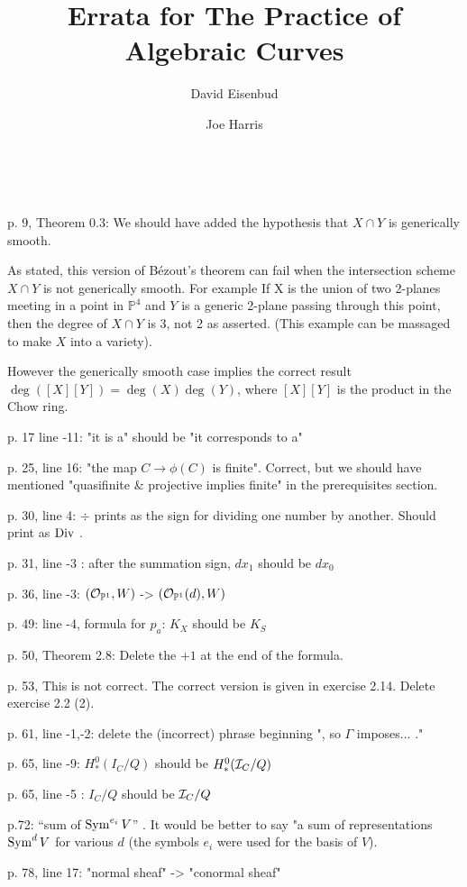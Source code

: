 \documentclass[twoside,12pt, leqno]{amsart}
\author[David Eisenbud]{David Eisenbud}
\author[Joe Harris ]{Joe Harris}
\title{Errata for The Practice of Algebraic Curves}
\def\PP{{\mathbb P}}
\begin{document}
\
\maketitle


\renewcommand{\thefootnote}{}%
%
p. 9, Theorem 0.3: We should have added the hypothesis that $X\cap Y$
is generically smooth. 

As stated, this version of B\'ezout's theorem can fail when the intersection
scheme $X\cap Y$ is not generically smooth. For example If X is the union of two 2-planes meeting in 
a point in $\PP^{4}$ and $Y$ is a generic 2-plane passing through this point, then
the degree of $X\cap Y$ is 3, not 2 as asserted. (This example can be massaged to
make $X$ into a variety).

However the generically smooth case implies the correct result
$\deg( [X][Y]) = \deg (X) \deg(Y)$, where $[X][Y]$ is the product in the Chow ring.

p. 17 line -11: "it is a" should be "it corresponds to a"

p. 25, line 16: "the map $C \to \phi(C)$ is finite". Correct, but we should have mentioned "quasifinite \& projective implies finite" in the prerequisites section.

p. 30, line 4:  $\div$ prints as the sign for dividing one number by another. Should print as $\rm Div$ . 

p. 31, line -3 : after the summation sign, $dx_1$ should be $dx_0$

p. 36, line -3: $(\sO_{\PP^1}, W)$  -> $(\sO_{\PP^1}(d), W)$

p. 49: line -4, formula for $p_a$: $K_X$ should be $K_S$

p. 50, Theorem 2.8: Delete the $+1$ at the end of the formula.

p. 53, This is not correct. The correct version is given in exercise 2.14. Delete exercise 2.2 (2). 

p. 61, line -1,-2: delete the (incorrect) phrase beginning ", so $\Gamma$ imposes... ."

p. 65, line -9: $H^0_*(I_C/Q)$ should be $H^0_*({\mathcal I}_C/Q)$

p. 65, line -5 : $I_C/Q$ should be ${\mathcal I}_C/Q$

p.72: ``sum of $\operatorname{Sym}^{e_i}V$'' . It would be better to say "a sum of representations $\operatorname{Sym}^dV$
for various $d$ (the symbols $e_i$ were used for the basis of $V$).

p. 78, line 17: "normal sheaf" -> "conormal sheaf"
\end{document}
